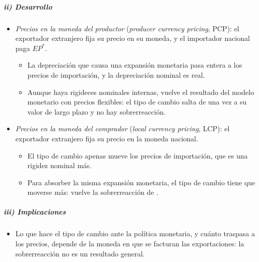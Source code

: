 \documentclass[11pt]{article}
\begin{document}
\subparagraph{ii) Desarrollo}
\begin{itemize}
\item \emph{Precios en la moneda del productor} (\emph{producer currency pricing}, PCP): el exportador extranjero fija su precio en su moneda, y el importador nacional paga $EP^*$.
  \begin{itemize}
  \item La depreciación que causa una expansión monetaria pasa entera a los precios de importación, y la depreciación nominal es real.
  \item Aunque haya rigideces nominales internas, vuelve el resultado del modelo monetario con precios flexibles: el tipo de cambio salta de una vez a su valor de largo plazo y no hay sobrerreacción.
  \end{itemize}
\item \emph{Precios en la moneda del comprador} (\emph{local currency pricing}, LCP): el exportador extranjero fija su precio en la moneda nacional.
  \begin{itemize}
  \item El tipo de cambio apenas mueve los precios de importación, que es una rigidez nominal más.
  \item Para absorber la misma expansión monetaria, el tipo de cambio tiene que moverse más: vuelve la sobrerreacción de \nocite{BettsDevereux2000}.
  \end{itemize}
\end{itemize}

\subparagraph{iii) Implicaciones}
\begin{itemize}
\item Lo que hace el tipo de cambio ante la política monetaria, y cuánto traspasa a los precios, depende de la moneda en que se facturan las exportaciones: la sobrerreacción no es un resultado general.
\end{itemize}
\end{document}
